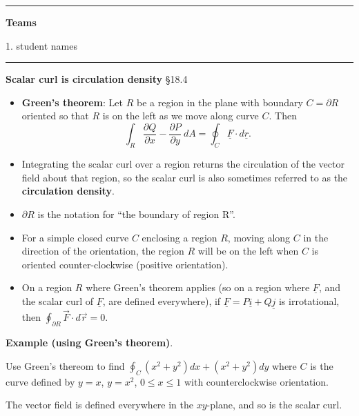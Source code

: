 \documentclass[12pt,letterpaper,noanswers]{exam}
\newcommand{\mb}[1]{\underline{#1}}
\begin{document}
\vspace{0.2cm}
\hrule
\vspace{0.2cm}

\noindent\textbf{Teams}

\begin{multicols}{2}

1.  student names
\end{multicols}

\vspace{0.2cm}
\hrule
\vspace{0.2cm}



\noindent\textbf{Scalar curl is circulation density} \S 18.4
\begin{tcolorbox}
\begin{itemize}
    \item \textbf{Green's theorem}: Let $R$ be a region in the plane with boundary $C = \partial R$ oriented so that $R$ is on the left as we move along curve $C$.  Then \[\int_R  \frac{\partial Q}{\partial x} - \frac{\partial P}{\partial y}\ dA = \oint_C \mb F \cdot d\mb r.\]
    \item Integrating the scalar curl over a region returns the circulation of the vector field about that region, so the scalar curl is also sometimes referred to as the \textbf{circulation density}.
    \item $\partial R$ is the notation for ``the boundary of region R''.
    \item For a simple closed curve $C$ enclosing a region $R$, moving along $C$ in the direction of the orientation, the region $R$ will be on the left when $C$ is oriented counter-clockwise (positive orientation).
    \item On a region $R$ where Green's theorem applies (so on a region where $\mb F$, and the scalar curl of $\mb F$, are defined everywhere), if $\mb F = P\mb i + Q\mb j$ is irrotational, then $\displaystyle\oint_{\partial R}\vec F\cdot d\vec r = 0$.
\end{itemize}
 

\end{tcolorbox}

\noindent\textbf{Example (using Green's theorem)}.

Use Green's thereom to find $\displaystyle\oint_C (x^2+y^2)dx + (x^2+y^2)dy$ where $C$ is the curve defined by $y = x$, $y = x^2$, $0\leq x\leq 1$ with counterclockwise orientation.

The vector field is defined everywhere in the $xy$-plane, and so is the scalar curl.
\end{document}
